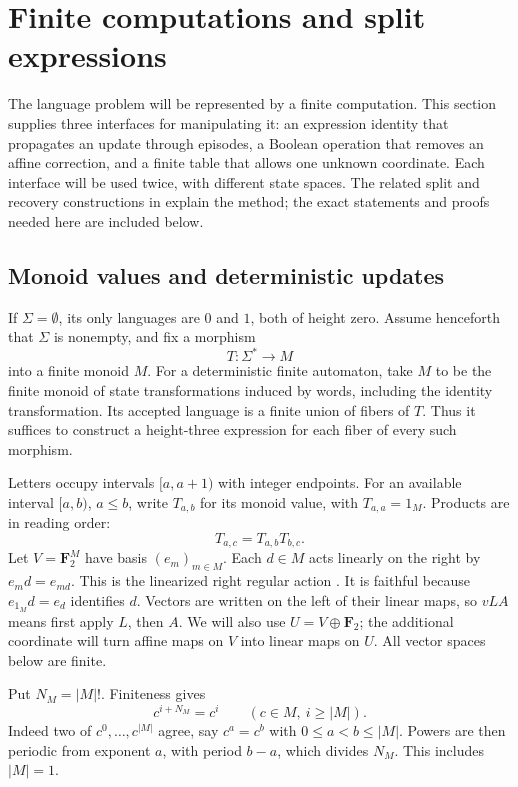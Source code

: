 \section{Finite computations and split expressions}\label{alg:section}

The language problem will be represented by a finite computation. This
section supplies three interfaces for manipulating it: an expression
identity that propagates an update through episodes, a Boolean operation
that removes an affine correction, and a finite table that allows one
unknown coordinate. Each interface will be used twice, with different
state spaces. The related split and recovery constructions in
\cite[Section~2]{HeightThirteen,HeightFour} explain the method; the exact
statements and proofs needed here are included below.

\subsection{Monoid values and deterministic updates}

If $\Sigma=\emptyset$, its only languages are $0$ and $1$, both of
height zero. Assume henceforth that $\Sigma$ is nonempty, and fix a
morphism
\[
                         T:\Sigma^*\longrightarrow M
\]
into a finite monoid $M$. For a deterministic finite automaton, take $M$
to be the finite monoid of state transformations induced by words,
including the identity transformation. Its accepted language is a finite
union of fibers of $T$. Thus it suffices to construct a height-three
expression for each fiber of every such morphism.

Letters occupy intervals $[a,a+1)$ with integer endpoints. For an
available interval $[a,b)$, $a\le b$, write $T_{a,b}$ for its monoid
value, with $T_{a,a}=1_M$. Products are in reading order:
\[
                         T_{a,c}=T_{a,b}T_{b,c}.
\]
Let $V=\mathbf F_2^M$ have basis $(e_m)_{m\in M}$. Each $d\in M$ acts
linearly on the right by $e_m d=e_{md}$. This is the linearized right regular action
\cite[Section~3.1]{AMSV2009}. It is faithful because
$e_{1_M}d=e_d$ identifies $d$. Vectors are written on the left of their
linear maps, so $vLA$ means first apply $L$, then $A$. We will also use
$U=V\oplus\mathbf F_2$; the additional coordinate will turn affine maps
on $V$ into linear maps on $U$. All vector spaces below are finite.

Put $N_M=|M|!$. Finiteness gives
\begin{equation}\label{alg:power-periodicity}
          c^{i+N_M}=c^i\qquad(c\in M,\ i\ge |M|).
\end{equation}
Indeed two of $c^0,\ldots,c^{|M|}$ agree, say $c^a=c^b$ with
$0\le a<b\le |M|$. Powers are then periodic from exponent $a$, with
period $b-a$, which divides $N_M$. This includes $|M|=1$.

